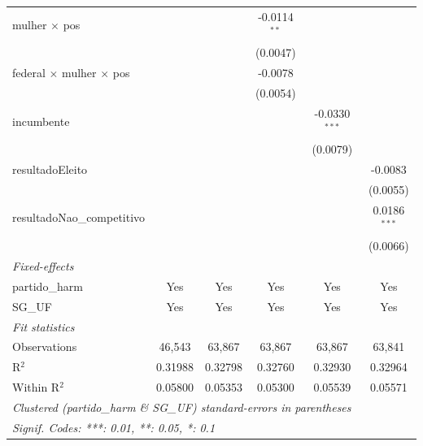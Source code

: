 \begin{tabular}{lccccc}
   mulher $\times$ pos                        &                       &                 & -0.0114$^{**}$  &                    &   \\   
                                              &                       &                 & (0.0047)        &                    &   \\   
   federal $\times$ mulher $\times$ pos       &                       &                 & -0.0078         &                    &   \\   
                                              &                       &                 & (0.0054)        &                    &   \\   
   incumbente                                 &                       &                 &                 & -0.0330$^{***}$    &   \\   
                                              &                       &                 &                 & (0.0079)           &   \\   
   resultadoEleito                            &                       &                 &                 &                    & -0.0083\\   
                                              &                       &                 &                 &                    & (0.0055)\\   
   resultadoNao\_competitivo                  &                       &                 &                 &                    & 0.0186$^{***}$\\   
                                              &                       &                 &                 &                    & (0.0066)\\   
   \midrule
   \emph{Fixed-effects}\\
   partido\_harm                              & Yes                   & Yes             & Yes             & Yes                & Yes\\  
   SG\_UF                                     & Yes                   & Yes             & Yes             & Yes                & Yes\\  
   \midrule
   \emph{Fit statistics}\\
   Observations                               & 46,543                & 63,867          & 63,867          & 63,867             & 63,841\\  
   R$^2$                                      & 0.31988               & 0.32798         & 0.32760         & 0.32930            & 0.32964\\  
   Within R$^2$                               & 0.05800               & 0.05353         & 0.05300         & 0.05539            & 0.05571\\  
   \midrule \midrule
   \multicolumn{6}{l}{\emph{Clustered (partido\_harm \& SG\_UF) standard-errors in parentheses}}\\
   \multicolumn{6}{l}{\emph{Signif. Codes: ***: 0.01, **: 0.05, *: 0.1}}\\
\end{tabular}
\par\endgroup


